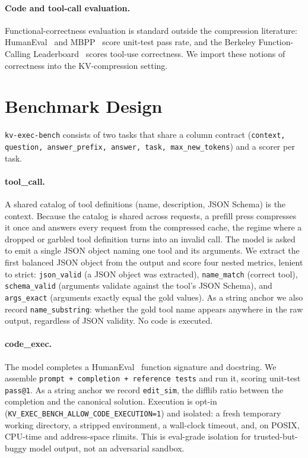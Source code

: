 \documentclass[11pt]{article}
\begin{document}
\paragraph{Code and tool-call evaluation.} Functional-correctness evaluation is standard outside the
compression literature: HumanEval~\cite{chen2021humaneval} and MBPP~\cite{austin2021mbpp} score
unit-test pass rate, and the Berkeley Function-Calling Leaderboard~\cite{yan2024bfcl} scores tool-use
correctness. We import these notions of correctness into the KV-compression setting.

\section{Benchmark Design}
\label{sec:design}

\texttt{kv-exec-bench} consists of two tasks that share a column contract
(\texttt{context, question, answer\_prefix, answer, task, max\_new\_tokens}) and a scorer per task.

\paragraph{tool\_call.} A shared catalog of tool definitions (name, description, JSON Schema) is the
context. Because the catalog is shared across requests, a prefill press compresses it once and answers
every request from the compressed cache, the regime where a dropped or garbled tool definition turns
into an invalid call. The model is asked to emit a single JSON object naming one tool and its
arguments. We extract the first balanced JSON object from the output and score four nested metrics,
lenient to strict: \texttt{json\_valid} (a JSON object was extracted), \texttt{name\_match} (correct
tool), \texttt{schema\_valid} (arguments validate against the tool's JSON Schema), and
\texttt{args\_exact} (arguments exactly equal the gold values). As a string anchor we also record
\texttt{name\_substring}: whether the gold tool name appears anywhere in the raw output, regardless of
JSON validity. No code is executed.

\paragraph{code\_exec.} The model completes a HumanEval~\cite{chen2021humaneval} function signature
and docstring. We assemble \texttt{prompt + completion + reference tests} and run it, scoring unit-test
\texttt{pass@1}. As a string anchor we record \texttt{edit\_sim}, the difflib ratio between the
completion and the canonical solution. Execution is opt-in
(\texttt{KV\_EXEC\_BENCH\_ALLOW\_CODE\_EXECUTION=1}) and isolated: a fresh temporary working
directory, a stripped environment, a wall-clock timeout, and, on POSIX, CPU-time and address-space
rlimits. This is eval-grade isolation for trusted-but-buggy model output, not an adversarial sandbox.
\end{document}
